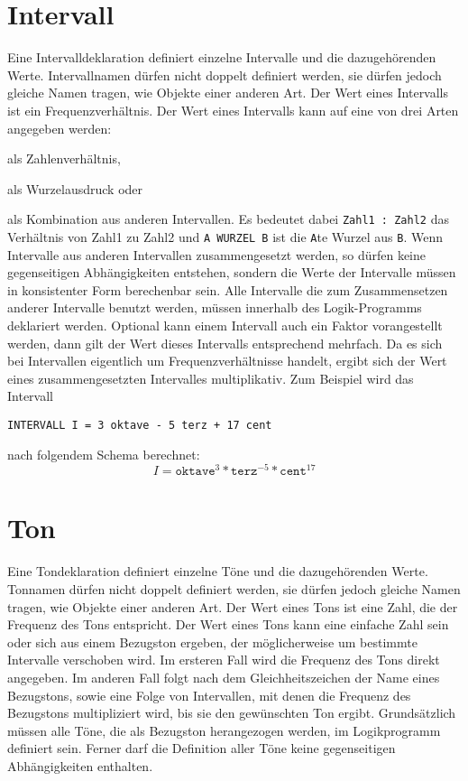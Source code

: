 

\chapter{Intervall}\label{cha:intervall}

Eine Intervalldeklaration definiert einzelne Intervalle und die
dazugehörenden Werte. Intervallnamen dürfen nicht doppelt definiert
werden, sie dürfen jedoch gleiche Namen tragen,
wie Objekte einer anderen Art.
Der Wert eines Intervalls ist ein Frequenzverhältnis.
Der Wert eines Intervalls kann auf eine von drei Arten angegeben werden:
\bi
  \item als Zahlenverhältnis,
  \item als Wurzelausdruck oder
  \item als Kombination aus anderen Intervallen.
\ei
Es bedeutet dabei
\texttt{Zahl1 : Zahl2} das Verhältnis von Zahl1 zu Zahl2 und
\texttt{A WURZEL B} ist die \texttt{A}te Wurzel aus \texttt{B}.
Wenn Intervalle aus anderen Intervallen zusammengesetzt werden,
so dürfen keine gegenseitigen Abhängigkeiten entstehen, sondern
die Werte der Intervalle müssen in konsistenter Form berechenbar sein.
Alle Intervalle die zum Zusammensetzen anderer Intervalle benutzt werden,
müssen innerhalb des Logik-Programms deklariert werden.
Optional kann einem Intervall auch ein Faktor
 vorangestellt werden, dann gilt der Wert dieses Intervalls
entsprechend mehrfach. Da es sich bei Intervallen eigentlich um
Frequenzverhältnisse handelt, ergibt sich der Wert eines zusammengesetzten
Intervalles multiplikativ. Zum Beispiel wird das Intervall
\begin{lstlisting} 
INTERVALL I = 3 oktave - 5 terz + 17 cent 
\end{lstlisting}
 nach folgendem Schema
berechnet: \[I = \mathtt{oktave}^{3} * \mathtt{terz}^{-5} * \mathtt{cent}^{17}\]





\chapter{Ton}\label{cha:ton}

Eine Tondeklaration definiert einzelne Töne und die
dazugehörenden Werte. Tonnamen dürfen nicht doppelt definiert
werden, sie dürfen jedoch gleiche Namen tragen,
wie Objekte einer anderen Art.
Der Wert eines Tons ist eine Zahl, die der Frequenz des Tons
entspricht. Der Wert eines Tons kann eine einfache Zahl sein oder
sich aus einem Bezugston
 ergeben, der möglicherweise
um bestimmte Intervalle verschoben wird.
Im ersteren Fall wird die Frequenz
 des Tons direkt angegeben.
Im anderen Fall folgt nach dem Gleichheitszeichen der Name eines
Bezugstons, sowie eine Folge von Intervallen, mit denen die Frequenz des
Bezugstons multipliziert wird, bis sie den gewünschten Ton ergibt.
Grundsätzlich müssen alle Töne, die als Bezugston herangezogen werden,
im Logikprogramm definiert sein. Ferner darf die Definition aller Töne
keine gegenseitigen Abhängigkeiten enthalten.

